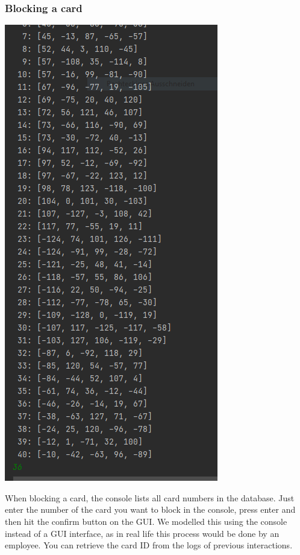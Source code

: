 \documentclass[a4paper]{article}
\begin{document}
\subsubsection{Blocking a card}
\begin{center}
    \includegraphics[scale=0.75]{cons.PNG}
\end{center}
When blocking a card, the console lists all card numbers in the database. Just enter the number of the card you want to block in the console, press enter and then hit the confirm button on the GUI. We modelled this using the console instead of a GUI interface, as in real life this process would be done by an employee. You can retrieve the card ID from the logs of previous interactions.
\end{document}
